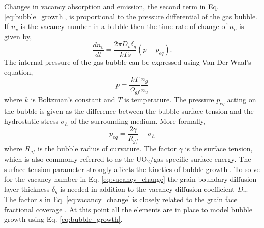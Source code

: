 Changes in vacancy absorption and emission, the second term in Eq. \ref{eq:bubble_growth}, is proportional to the pressure differential of the gas bubble. If $n_v$ is the vacancy number in a bubble then the time rate of change of $n_v$ is given by,
\begin{equation}
\label{eq:vacancy_change}
 \frac{dn_v}{dt} = \frac{2\pi D_v \delta_g}{kTs}\left(p - p_{eq}\right).
\end{equation}    
The internal pressure of the gas bubble can be expressed using Van Der Waal's equation,
\begin{equation}
\label{eq:interal_gas_pressure}
 p = \frac{kT}{\Omega_{gf}} \frac{n_g}{n_v}
\end{equation}
where $k$ is Boltzman's constant and $T$ is temperature. The pressure $p_{eq}$ acting on the bubble is given as the difference between the bubble surface tension and the hydrostatic stress $\sigma_h$ of the surrounding medium. More formally,
\begin{equation}
\label{eq:external_gas_pressure}
 p_{eq} = \frac{2\gamma}{R_{gf}} - \sigma_h
\end{equation} 
where $R_{gf}$ is the bubble radius of curvature. The factor $\gamma$ is the surface tension, which is also commonly referred to as the UO$_2$/gas specific surface energy. The surface tension parameter strongly affects the kinetics of bubble growth \cite{Swiler3}. To solve for the vacancy number in Eq. \ref{eq:vacancy_change} the grain boundary diffusion layer thickness $\delta_g$ is needed in addition to the vacancy diffusion coefficient $D_v$. The factor $s$ in Eq. \ref{eq:vacancy_change} is closely related to the grain face fractional coverage \cite{Pastore1}. At this point all the elements are in place to model bubble growth using Eq. \ref{eq:bubble_growth}.  

